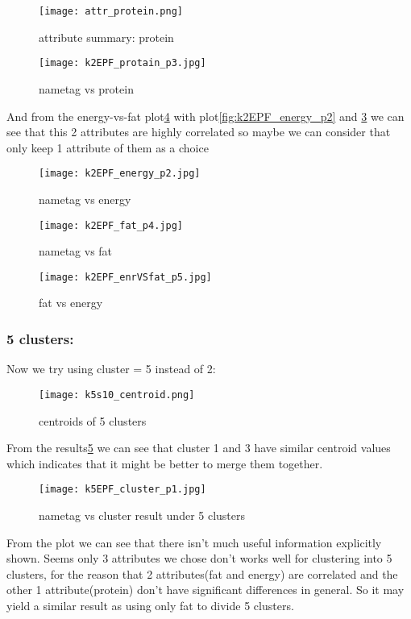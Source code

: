 \documentclass{article}
\begin{document}
\begin{figure}[H]
\centering
\texttt{[image: attr\_protein.png]}
\caption{\label{fig:protein}attribute summary: protein}
\end{figure}
\begin{figure}[H]
\centering
\texttt{[image: k2EPF\_protain\_p3.jpg]}
\caption{\label{fig:k2EPF_protain_p3}nametag vs protein}
\end{figure}

And from the energy-vs-fat plot\ref{fig:k2EPF_enrVSfat_p5} with plot\ref{fig:k2EPF_energy_p2} and \ref{fig:k2EPF_fat_p4} we can see that this 2 attributes are highly correlated so maybe we can consider that only keep 1 attribute of them as a choice 

\begin{figure}[H]
    \begin{minipage}[t]{0.5\linewidth}
        \centering
        \texttt{[image: k2EPF\_energy\_p2.jpg]}
        \caption{nametag vs energy}
        \label{fig:k2EPF_energy_p2}
    \end{minipage}
    \begin{minipage}[t]{0.5\linewidth}
        \centering
        \texttt{[image: k2EPF\_fat\_p4.jpg]}
        \caption{nametag vs fat}
        \label{fig:k2EPF_fat_p4}
    \end{minipage}
\end{figure}

\begin{figure}[H]
\centering
\texttt{[image: k2EPF\_enrVSfat\_p5.jpg]}
\caption{\label{fig:k2EPF_enrVSfat_p5}fat vs energy}
\end{figure}

\subsubsection{5 clusters:}
Now we try using cluster = 5 instead of 2:

\begin{figure}[H]
\centering
\texttt{[image: k5s10\_centroid.png]}
\caption{\label{fig:k5s10_centroid} centroids of 5 clusters}
\end{figure}
From the results\ref{fig:k5s10_centroid} we can see that cluster 1 and 3 have similar centroid values which indicates that it might be better to merge them together.

\begin{figure}[H]
\centering
\texttt{[image: k5EPF\_cluster\_p1.jpg]}
\caption{\label{fig:k5EPF_cluster_p1} nametag vs cluster result under 5 clusters}
\end{figure}
From the plot we can see that there isn’t much useful information explicitly shown. Seems only 3 attributes we chose don’t works well for clustering into 5 clusters, for the reason that 2 attributes(fat and energy) are correlated and the other 1 attribute(protein) don’t have significant differences in general. So it may yield a similar result as using only fat to divide 5 clusters.
\end{document}
